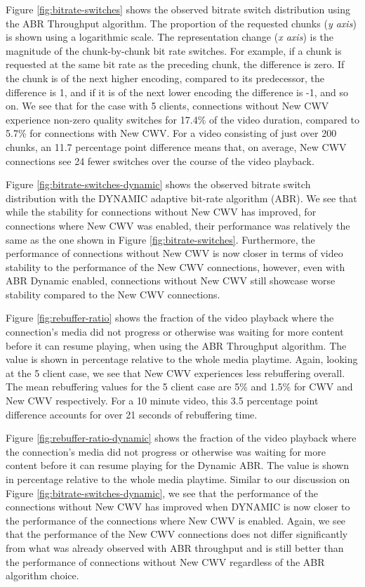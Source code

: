 \documentclass[10pt,sigconf]{acmart}
\begin{document}
Figure \ref{fig:bitrate-switches} shows the observed bitrate switch distribution using the ABR Throughput algorithm. The proportion of the requested chunks (\emph{y axis}) is shown using a logarithmic scale. The representation change (\emph{x axis}) is the magnitude of the chunk-by-chunk bit rate switches. For example, if a chunk is requested at the same bit rate as the preceding chunk, the difference is zero. If the chunk is of the next higher encoding, compared to its predecessor, the difference is 1, and if it is of the next lower encoding the difference is -1, and so on. We see that for the case with 5 clients, connections without New CWV experience non-zero quality switches for 17.4\% of the video duration, compared to 5.7\% for connections with New CWV. For a video consisting of just over 200 chunks, an 11.7 percentage point difference means that, on average, New CWV connections see 24 fewer switches over the course of the video playback.

Figure \ref{fig:bitrate-switches-dynamic} shows the observed bitrate switch distribution with the DYNAMIC adaptive bit-rate algorithm (ABR). We see that while the stability for connections without New CWV has improved, for connections where New CWV was enabled, their performance was relatively the same as the one shown in Figure \ref{fig:bitrate-switches}. Furthermore, the performance of connections without New CWV is now closer in terms of video stability to the performance of the New CWV connections, however, even with ABR Dynamic enabled, connections without New CWV still showcase worse stability compared to the New CWV connections.

Figure \ref{fig:rebuffer-ratio} shows the fraction of the video playback where the connection's media did not progress or otherwise was waiting for more content before it can resume playing, when using the ABR Throughput algorithm. The value is shown in percentage relative to the whole media playtime. Again, looking at the 5 client case, we see that New CWV experiences less rebuffering overall. The mean rebuffering values for the 5 client case are 5\% and 1.5\% for CWV and New CWV respectively. For a 10 minute video, this 3.5 percentage point difference accounts for over 21 seconds of rebuffering time.

Figure \ref{fig:rebuffer-ratio-dynamic} shows the fraction of the video playback where the connection's media did not progress or otherwise was waiting for more content before it can resume playing for the Dynamic ABR. The value is shown in percentage relative to the whole media playtime. Similar to our discussion on Figure \ref{fig:bitrate-switches-dynamic}, we see that the performance of the connections without New CWV has improved when DYNAMIC is now closer to the performance of the connections where New CWV is enabled. Again, we see that the performance of the New CWV connections does not differ significantly from what was already observed with ABR throughput and is still better than the performance of connections without New CWV regardless of the ABR algorithm choice.
\end{document}
